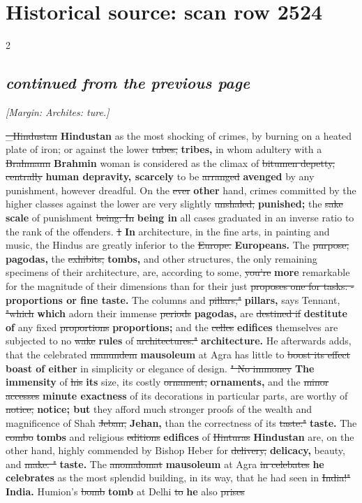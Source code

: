 \documentclass[10pt]{article}
\begin{document}
\section*{Historical source: scan row 2524}
\begin{multicols}{2}
\subsection*{\textit{continued from the previous page}}
{\small\itshape [Margin: Archites: \emph{ture.}]}\par
\sout{\_Hindustan} \textbf{Hindustan} as the most shocking of crimes, by burning on a heated plate of iron; or against the lower \sout{tubes,} \textbf{tribes,} in whom adultery with a \sout{Brahmann} \textbf{Brahmin} woman is considered as the climax of \sout{bitumen depetty, centrally} \textbf{human depravity, scarcely} to be \sout{arranged} \textbf{avenged} by any punishment, however dreadful. On the \sout{ever} \textbf{other} hand, crimes committed by the higher classes against the lower are very slightly \sout{unshaled,} \textbf{punished;} the \sout{sake} \textbf{scale} of punishment \sout{being: In} \textbf{being in} all cases graduated in an inverse ratio to the rank of the offenders. \sout{1} \textbf{In} architecture, in the fine arts, in painting and music, the Hindus are greatly inferior to the \sout{Europe.} \textbf{Europeans.} The \sout{purpose,} \textbf{pagodas,} the \sout{exhibits,} \textbf{tombs,} and other structures, the only remaining specimens of their architecture, are, according to some, \sout{you’re} \textbf{more} remarkable for the magnitude of their dimensions than for their just \sout{proposes one for tasks. -} \textbf{proportions or fine taste.} The columns and \sout{pillars,"} \textbf{pillars,} says Tennant, \sout{"which} \textbf{which} adorn their immense \sout{periods} \textbf{pagodas,} are \sout{destined if} \textbf{destitute of} any fixed \sout{proportions} \textbf{proportions;} and the \sout{celles} \textbf{edifices} themselves are subjected to no \sout{wake} \textbf{rules} of \sout{architectures."} \textbf{architecture.} He afterwards adds, that the celebrated \sout{manundem} \textbf{mausoleum} at Agra has little to \sout{boost its effect} \textbf{boast of either} in simplicity or elegance of design. \sout{" No immoney} \textbf{The immensity} of \sout{his} \textbf{its} size, its costly \sout{ornament,} \textbf{ornaments,} and the \sout{minor accesses} \textbf{minute exactness} of its decorations in particular parts, are worthy of \sout{notice,} \textbf{notice; but} they afford much stronger proofs of the wealth and magnificence of Shah \sout{Jeban,} \textbf{Jehan,} than the correctness of its \sout{taste."} \textbf{taste.} The \sout{combo} \textbf{tombs} and religious \sout{editions} \textbf{edifices} of \sout{Hinturas} \textbf{Hindustan} are, on the other hand, highly commended by Bishop Heber for \sout{delivery,} \textbf{delicacy,} beauty, and \sout{make. "} \textbf{taste.} The \sout{anomalomat} \textbf{mausoleum} at Agra \sout{in celebates} \textbf{he celebrates} as the most splendid building, in its way, that he had seen in \sout{India!"} \textbf{India.} Humion's \sout{bomb} \textbf{tomb} at Delhi \sout{to} \textbf{he} also \sout{prises} 
\end{multicols}
\end{document}

